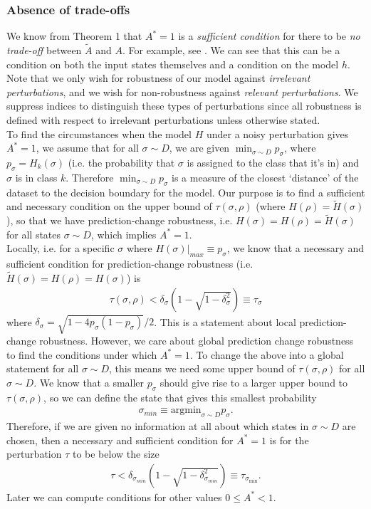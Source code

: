 \documentclass[onecolumn,prx, superscriptaddress,longbibliography,margin=1mm 11pt]{revtex4-2}
\begin{document}
\subsubsection{Absence of trade-offs}
We know from Theorem 1 that $A^*=1$ is a \textit{sufficient condition} for there to be \textit{no trade-off} between $\tilde{A}$ and $A$. For example, see \cite{yang}. We can see that this can be a condition on both the input states themselves and a condition on the model $h$. Note that we only wish for robustness of our model against \textit{irrelevant perturbations}, and we wish for non-robustness against \textit{relevant perturbations}. We suppress indices to distinguish these types of perturbations since all robustness is defined with respect to irrelevant perturbations unless otherwise stated. \\

To find the circumstances when the model $H$ under a noisy perturbation gives $A^*=1$, we assume that for all $\sigma \sim D$, we are given 
$\min_{\sigma \sim D} p_{\sigma}$, where $p_{\sigma}=H_k(\sigma)$ (i.e. the probability that $\sigma$ is assigned to the class that it's in) and $\sigma$ is in class $k$. Therefore $\min_{\sigma \sim D} p_{\sigma}$ is a measure of the closest `distance' of the dataset to the decision boundary for the model. Our purpose is to find a sufficient and necessary condition on the upper bound of $\tau(\sigma, \rho)$ (where $H(\rho)=\tilde{H}(\sigma)$), so that we have prediction-change robustness, i.e. $H(\sigma)=H(\rho)=\tilde{H}(\sigma)$ for all states $\sigma \sim D$, which implies $A^*=1$. \\

Locally, i.e. for a specific $\sigma$ where $H(\sigma)\vert_{max} \equiv p_{\sigma}$, we know that a necessary and sufficient condition for prediction-change robustness (i.e. $\tilde{H}(\sigma)=H(\rho)=H(\sigma)$) is 
\begin{align}
    \tau(\sigma, \rho)<\delta_{\sigma}(1-\sqrt{1-\delta_{\sigma}^2})\equiv \tau_{\sigma}
\end{align}
where $\delta_{\sigma}=\sqrt{1-4p_{\sigma}(1-p_{\sigma})}/2$. This is a statement about local prediction-change robustness. However, we care about global prediction change robustness to find the conditions under which $A^*=1$. To change the above into a global statement for all $\sigma \sim D$, this means we need some upper bound of $\tau(\sigma, \rho)$ for all $\sigma \sim D$. We know that a smaller $p_{\sigma}$ should give rise to a larger upper bound to $\tau(\sigma, \rho)$, so we can define the state that gives this smallest probability
\begin{align}
    \sigma_{min} \equiv \text{argmin}_{\sigma \sim D} p_{\sigma}.
\end{align}
Therefore, if we are given no information at all about which states in $\sigma \sim D$ are chosen, then a necessary and sufficient condition for $A^*=1$ is for the perturbation $\tau$ to be below the size
\begin{align}
    \tau<\delta_{\sigma_{min}}(1-\sqrt{1-\delta_{\sigma_{min}}^2}) \equiv \tau_{\sigma_{\min}}. 
\end{align}
Later we can compute conditions for other values $0\leq A^*<1$. \\
\end{document}
